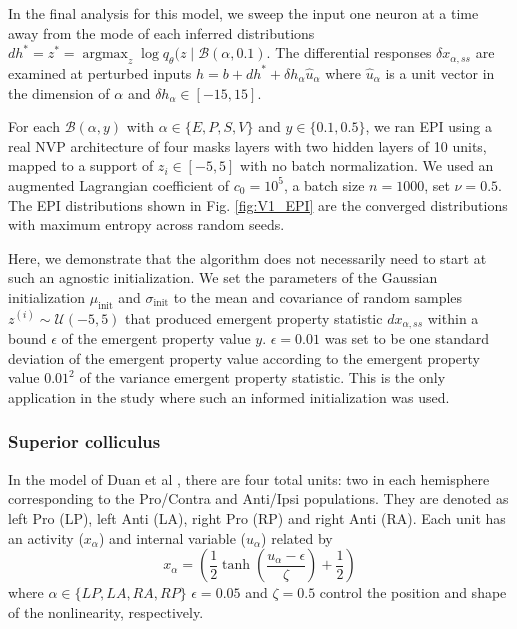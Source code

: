 \documentclass[11pt]{article}
\DeclareMathOperator*{\argmax}{argmax}
\begin{document}
In the final analysis for this model, we sweep the input one neuron at a time away from the mode of each inferred distributions $dh^* = z^* = \argmax_{z} \log q_\theta(z \mid \mathcal{B}(\alpha, 0.1)$.
The differential responses $\delta x_{\alpha,ss}$ are examined at perturbed inputs  $h = b + dh^* + \delta h_\alpha \hat{u}_\alpha$ where $\hat{u}_\alpha$ is a unit vector in the dimension of $\alpha$ and $\delta h_\alpha \in \left[-15,15\right]$.

For each $\mathcal{B}(\alpha, y)$ with $\alpha \in \{E, P, S, V\}$ and $y \in \{0.1, 0.5\}$, we ran EPI using a real NVP architecture of four masks layers with two hidden layers of 10 units,  mapped to a support of $z_i \in \left[-5, 5\right]$ with no batch normalization.  We used an augmented Lagrangian coefficient of $c_0 = 10^5$, a batch size $n=1000$, set $\nu = 0.5$.
The EPI distributions shown in Fig. \ref{fig:V1_EPI} are the converged distributions with maximum entropy across random seeds.

Here, we demonstrate that the algorithm does not necessarily need to start at such an agnostic initialization.  We set the parameters of the Gaussian initialization $\mu_\text{init}$ and $\sigma_\text{init}$ to the mean and covariance of random samples $z^{(i)} \sim \mathcal{U}(-5, 5)$ that produced emergent property statistic $dx_{\alpha,ss}$ within a bound $\epsilon$ of the emergent property value $y$. $\epsilon=0.01$ was set to be one standard deviation of the emergent property value according to the emergent property value $0.01^2$ of the variance emergent property statistic.  This is the only application in the study where such an informed initialization was used.

\subsubsection{Superior colliculus}\label{methods_SC}
In the model of Duan et al \cite{duan2018collicular}, there are four total units: two in each hemisphere corresponding to the Pro/Contra and Anti/Ipsi populations.  They are denoted as left Pro (LP), left Anti (LA), right Pro (RP) and right Anti (RA).  Each unit has an activity ($x_\alpha$) and internal variable ($u_\alpha$) related by
\begin{equation}
x_\alpha =\left(\frac{1}{2}\tanh\left(\frac{u_\alpha - \epsilon}{\zeta}\right)+ \frac{1}{2} \right)
\end{equation}
where $\alpha \in \{LP, LA, RA, RP\}$ $\epsilon = 0.05$ and $\zeta = 0.5$ control the position and shape of the nonlinearity, respectively.
\end{document}
